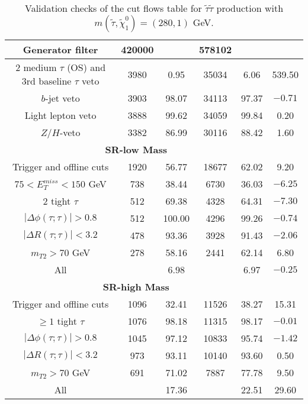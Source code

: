 \documentclass[12pt,A4paper,pdftex, ]{article}
\begin{document}
\begin{table}[h!]
\begin{center}
\begin{tabular}{|c|c|c|c|c|c|}
Generator filter & 420000 &  & 578102 &  & \\ \hline
2 medium $\tau$ (OS) and 3rd baseline $\tau$ veto & 3980 & 0.95 & 35034 & 6.06 & 539.50 \\ \hline
$b$-jet veto & 3903 & 98.07 & 34113 & 97.37 & $-0.71$ \\ \hline
Light lepton veto & 3888 & 99.62 & 34059 & 99.84 & 0.20 \\ \hline
$Z/H$-veto & 3382 & 86.99 & 30116 & 88.42 & 1.60 \\ \hline
%
\multicolumn{5}{|c|}{ \textbf{SR-low Mass} }\\\hline
%
Trigger and offline cuts & 1920 & 56.77 & 18677 & 62.02 & 9.20 \\ \hline
$ 75 < E^{miss}_T < 150 $ GeV & 738 & 38.44 & 6730 & 36.03 & $-6.25$ \\ \hline
2 tight $\tau$ & 512 & 69.38 & 4328 & 64.31 & $-7.30$ \\ \hline
$ |\Delta\phi(\tau;\tau)| > 0.8 $ & 512 & 100.00 & 4296 & 99.26 & $-0.74$ \\ \hline
$ |\Delta R(\tau;\tau)| < 3.2 $ & 478 & 93.36 & 3928 & 91.43 & $-2.06$ \\ \hline
$ m_{T2} > 70 $ GeV & 278 & 58.16 & 2441 & 62.14 & 6.80 \\ \hline
All &  & 6.98 &  & 6.97 & $-0.25$ \\ \hline
%
\hline
\multicolumn{5}{|c|}{ \textbf{SR-high Mass} }\\\hline
%
Trigger and offline cuts & 1096 & 32.41 & 11526 & 38.27 & 15.31 \\ \hline
$ \geq 1 $ tight $\tau$ & 1076 & 98.18 & 11315 & 98.17 & $-0.01$ \\ \hline
$ |\Delta\phi(\tau;\tau)| > 0.8 $ & 1045 & 97.12 & 10833 & 95.74 & $-1.42$ \\ \hline
$ |\Delta R(\tau;\tau)| < 3.2 $ & 973 & 93.11 & 10140 & 93.60 & 0.50 \\ \hline
$ m_{T2} > 70 $ GeV & 691 & 71.02 & 7887 & 77.78 & 9.50 \\ \hline
All &  & 17.36 &  & 22.51 & 29.60 \\ \hline

\end{tabular}
\end{center}
\caption{Validation checks of the cut flows table for $ \tilde{\tau}\tilde{\tau} $ production with $ m(\tilde{\tau},\tilde{\chi}^0_1) = (280,1) $ GeV.}
\label{280GeV}
\end{table} 
\end{document}
